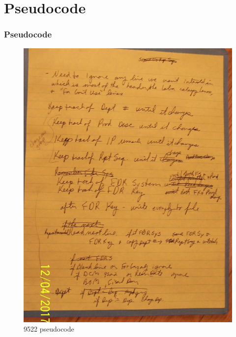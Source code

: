 \documentclass{beamer}\usepackage[]{graphicx}\usepackage[]{color}
\begin{document}
\section{Pseudocode}
\begin{frame}[fragile]
  \frametitle{Pseudocode}
  
\begin{figure}
\includegraphics[scale=0.5]{pseudocode}
\caption{9522 pseudocode}
\end{figure}
  
\end{frame}
\end{document}
